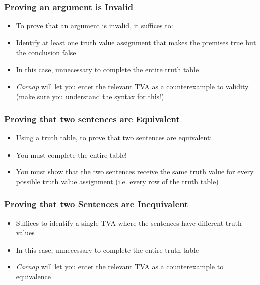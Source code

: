 \begin{frame}
\frametitle{Proving an argument is Invalid}

\begin{itemize}[<+->]

\item To prove that an argument is invalid, it suffices to:

\item Identify at least one truth value assignment that makes the premises true but the conclusion false

\item In this case, unnecessary to complete the entire truth table

\item \textit{Carnap} will let you enter the relevant TVA as a counterexample to validity (make sure you understand the syntax for this!)


\end{itemize}
\end{frame}

\begin{frame}
\frametitle{Proving that two sentences are Equivalent}

\begin{itemize}[<+->]

\item Using a truth table, to prove that two sentences are equivalent:

\item You must complete the entire table!

\item You must show that the two sentences receive the same truth value for every possible truth value assignment (i.e. every row of the truth table)

\end{itemize}
\end{frame}

\begin{frame}
\frametitle{Proving that two Sentences are Inequivalent}

\begin{itemize}[<+->]

\item Suffices to identify a single TVA where the sentences have different truth values

\item In this case, unnecessary to complete the entire truth table

\item \textit{Carnap} will let you enter the relevant TVA as a counterexample to equivalence

\end{itemize}
\end{frame}

